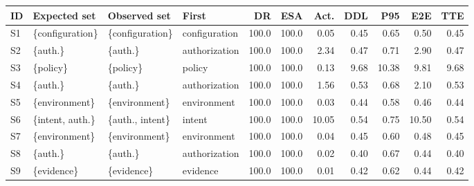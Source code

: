 \begin{tabular}{@{}llllrrrrrrr@{}}
\toprule
ID & Expected set & Observed set & First & DR & ESA & Act. & DDL & P95 & E2E & TTE \\
\midrule
S1 & \{configuration\} & \{configuration\} & configuration & 100.0 & 100.0 & 0.05 & 0.45 & 0.65 & 0.50 & 0.45 \\
S2 & \{auth.\} & \{auth.\} & authorization & 100.0 & 100.0 & 2.34 & 0.47 & 0.71 & 2.90 & 0.47 \\
S3 & \{policy\} & \{policy\} & policy & 100.0 & 100.0 & 0.13 & 9.68 & 10.38 & 9.81 & 9.68 \\
S4 & \{auth.\} & \{auth.\} & authorization & 100.0 & 100.0 & 1.56 & 0.53 & 0.68 & 2.10 & 0.53 \\
S5 & \{environment\} & \{environment\} & environment & 100.0 & 100.0 & 0.03 & 0.44 & 0.58 & 0.46 & 0.44 \\
S6 & \{intent, auth.\} & \{auth., intent\} & intent & 100.0 & 100.0 & 10.05 & 0.54 & 0.75 & 10.50 & 0.54 \\
S7 & \{environment\} & \{environment\} & environment & 100.0 & 100.0 & 0.04 & 0.45 & 0.60 & 0.48 & 0.45 \\
S8 & \{auth.\} & \{auth.\} & authorization & 100.0 & 100.0 & 0.02 & 0.40 & 0.67 & 0.44 & 0.40 \\
S9 & \{evidence\} & \{evidence\} & evidence & 100.0 & 100.0 & 0.01 & 0.42 & 0.62 & 0.44 & 0.42 \\
\bottomrule
\end{tabular}
